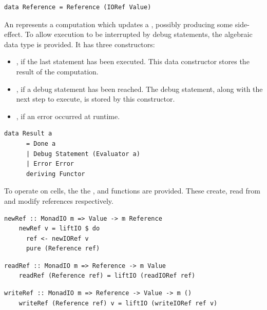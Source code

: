 \documentclass[UdineBachThesis,american,11pt,draft]{PhdThesis}
\begin{document}
  \begin{lstlisting}[gobble=4,basicstyle=\ttfamily\small]
    data Reference = Reference (IORef Value)
  \end{lstlisting}

  An \lstinline@Evaluator@ represents a computation which updates a
  \lstinline@State@, possibly producing some side-effect. To allow execution to
  be interrupted by debug statements, the algebraic data type \lstinline@Result@
  is provided. It has three constructors:

  \begin{itemize}
    \item \lstinline@Done@, if the last statement has been executed. This data
    constructor stores the result of the computation.

    \item \lstinline@Debug@, if a debug statement has been reached. The debug
    statement, along with the next step to execute, is stored by this
    constructor.

    \item \lstinline@Error@, if an error occurred at runtime.
  \end{itemize}

  \begin{lstlisting}[gobble=4,basicstyle=\ttfamily\small]
    data Result a
      = Done a
      | Debug Statement (Evaluator a)
      | Error Error
      deriving Functor
  \end{lstlisting}

  To operate on cells, the the \lstinline@newRef@, \lstinline@readRef@ and
  \lstinline@writeRef@ functions are provided. These create, read from and
  modify references respectively.

  \begin{lstlisting}[gobble=4,basicstyle=\ttfamily\small]
    newRef :: MonadIO m => Value -> m Reference
    newRef v = liftIO $ do
      ref <- newIORef v
      pure (Reference ref)
  \end{lstlisting}

  \begin{lstlisting}[gobble=4,basicstyle=\ttfamily\small]
    readRef :: MonadIO m => Reference -> m Value
    readRef (Reference ref) = liftIO (readIORef ref)
  \end{lstlisting}

  \begin{lstlisting}[gobble=4,basicstyle=\ttfamily\small]
    writeRef :: MonadIO m => Reference -> Value -> m ()
    writeRef (Reference ref) v = liftIO (writeIORef ref v)
  \end{lstlisting}
\end{document}

